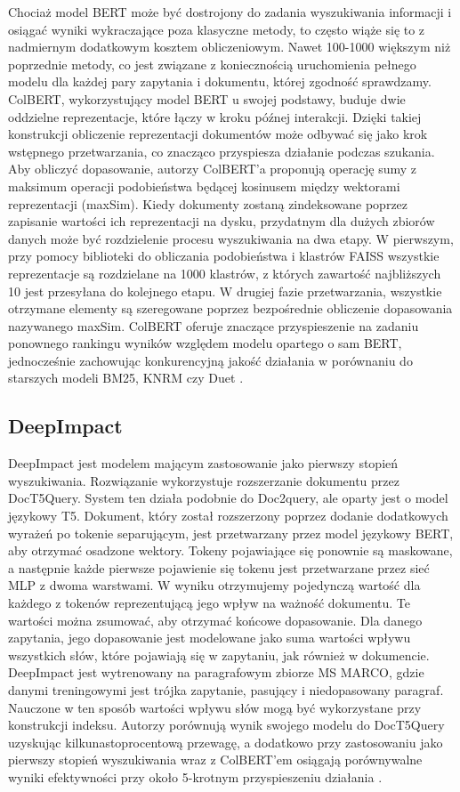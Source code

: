 Chociaż model BERT może być dostrojony do zadania wyszukiwania informacji i osiągać wyniki wykraczające poza klasyczne metody, to często wiąże się to z nadmiernym dodatkowym kosztem obliczeniowym. Nawet 100-1000 większym niż poprzednie metody, co jest związane z koniecznością
uruchomienia pełnego modelu dla każdej pary zapytania i dokumentu, której zgodność sprawdzamy.
ColBERT, wykorzystujący model BERT u swojej podstawy, buduje dwie oddzielne reprezentacje, które
łączy w kroku późnej interakcji. Dzięki takiej konstrukcji obliczenie reprezentacji dokumentów może
odbywać się jako krok wstępnego przetwarzania, co znacząco przyspiesza działanie podczas szukania.
Aby obliczyć dopasowanie, autorzy ColBERT'a proponują operację sumy z maksimum operacji podobieństwa
będącej kosinusem między wektorami reprezentacji (maxSim). Kiedy dokumenty zostaną
zindeksowane poprzez zapisanie wartości ich reprezentacji na dysku, przydatnym dla dużych zbiorów danych może być rozdzielenie procesu wyszukiwania na dwa etapy. W pierwszym, przy pomocy
biblioteki do obliczania podobieństwa i klastrów FAISS wszystkie reprezentacje są rozdzielane na 1000
klastrów, z których zawartość najbliższych 10 jest przesyłana do kolejnego etapu. W drugiej fazie
przetwarzania, wszystkie otrzymane elementy są szeregowane poprzez bezpośrednie obliczenie
dopasowania nazywanego maxSim. ColBERT oferuje znaczące przyspieszenie na zadaniu ponownego
rankingu wyników względem modelu opartego o sam BERT, jednocześnie zachowując konkurencyjną
jakość działania w porównaniu do starszych modeli BM25, KNRM czy Duet  \autocite{khattab2020colbert}.

\subsection{DeepImpact}

DeepImpact jest modelem mającym zastosowanie jako pierwszy stopień wyszukiwania.
Rozwiązanie wykorzystuje rozszerzanie dokumentu przez DocT5Query. System ten działa podobnie do
Doc2query, ale oparty jest o model językowy T5. Dokument, który został rozszerzony poprzez dodanie
dodatkowych wyrażeń po tokenie separującym, jest przetwarzany przez model językowy BERT, aby
otrzymać osadzone wektory. Tokeny pojawiające się ponownie są maskowane, a następnie każde
pierwsze pojawienie się tokenu jest przetwarzane przez sieć MLP z dwoma warstwami. W wyniku
otrzymujemy pojedynczą wartość dla każdego z tokenów reprezentującą jego wpływ na ważność
dokumentu. Te wartości można zsumować, aby otrzymać końcowe dopasowanie. Dla danego
zapytania, jego dopasowanie jest modelowane jako suma wartości wpływu wszystkich słów, które
pojawiają się w zapytaniu, jak również w dokumencie. DeepImpact jest wytrenowany na
paragrafowym zbiorze MS MARCO, gdzie danymi treningowymi jest trójka zapytanie, pasujący i
niedopasowany paragraf. Nauczone w ten sposób wartości wpływu słów mogą być wykorzystane przy
konstrukcji indeksu. Autorzy porównują wynik swojego modelu do DocT5Query uzyskując
kilkunastoprocentową przewagę, a dodatkowo przy zastosowaniu jako pierwszy stopień wyszukiwania
wraz z ColBERT'em osiągają porównywalne wyniki efektywności przy około 5-krotnym przyspieszeniu
działania \autocite{mallia2021learning}.

